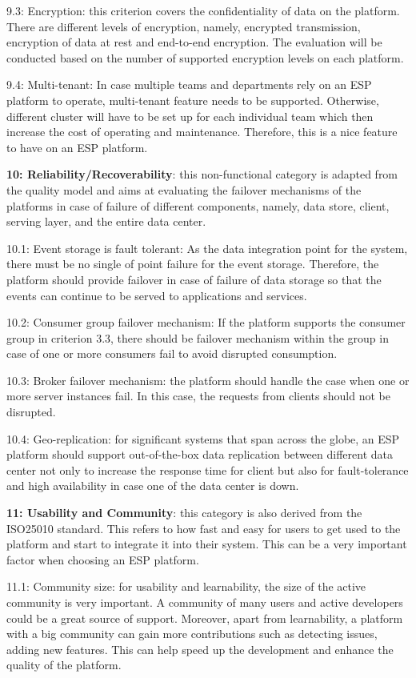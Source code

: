 9.3: Encryption: this criterion covers the confidentiality of data on the platform. There are different levels of encryption, namely, encrypted transmission, encryption of data at rest and end-to-end encryption. The evaluation will be conducted based on the number of supported encryption levels on each platform.

9.4: Multi-tenant: In case multiple teams and departments rely on an ESP platform to operate, multi-tenant feature needs to be supported. Otherwise, different cluster will have to be set up for each individual team which then increase the cost of operating and maintenance. Therefore, this is a nice feature to have on an ESP platform.

\textbf{10: Reliability/Recoverability}: this non-functional category is adapted from the quality model and aims at evaluating the failover mechanisms of the platforms in case of failure of different components, namely, data store, client, serving layer, and the entire data center.

10.1: Event storage is fault tolerant: As the data integration point for the system, there must be no single of point failure for the event storage. Therefore, the platform should provide failover in case of failure of data storage so that the events can continue to be served to applications and services.

10.2: Consumer group failover mechanism: If the platform supports the consumer group in criterion 3.3, there should be failover mechanism within the group in case of one or more consumers fail to avoid disrupted consumption.

10.3: Broker failover mechanism: the platform should handle the case when one or more server instances fail. In this case, the requests from clients should not be disrupted. 

10.4: Geo-replication: for significant systems that span across the globe, an ESP platform should support out-of-the-box data replication between different data center not only to increase the response time for client but also for fault-tolerance and high availability in case one of the data center is down.

\textbf{11: Usability and Community}: this category is also derived from the ISO25010 standard. This refers to how fast and easy for users to get used to the platform and start to integrate it into their system. This can be a very important factor when choosing an ESP platform. 

11.1: Community size: for usability and learnability, the size of the active community is very important. A community of many users and active developers could be a great source of support. Moreover, apart from learnability, a platform with a big community can gain more contributions such as detecting issues, adding new features. This can help speed up the development and enhance the quality of the platform.

